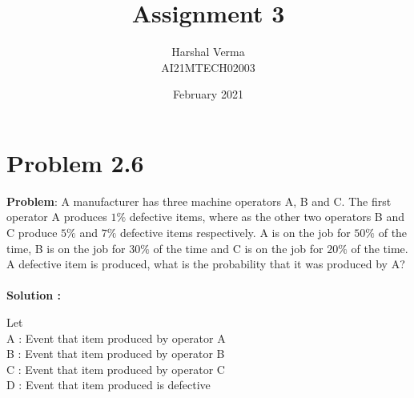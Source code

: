 \documentclass[journal,12pt,twocolumn]{IEEEtran}
\title{Assignment 3}
\author{Harshal Verma\\
AI21MTECH02003}
\date{February 2021}
\begin{document}
\maketitle
\section{Problem 2.6}
\textbf{Problem}: A manufacturer has three machine operators
A, B and C. The first operator A produces
$1\%$ defective items, where as the other two
operators B and C produce $5\%$ and $7\%$
defective items respectively. A is on the job
for $50\%$ of the time, B is on the job for $30\%$
of the time and C is on the job for $20\%$ of
the time. A defective item is produced, what
is the probability that it was produced by A?
\\
\\
\textbf{Solution :}

 Let\\
A : Event that item produced by operator A \\
B : Event that item produced by operator B \\
C : Event that item produced by operator C \\
D : Event that item produced is defective \\
\end{document}
